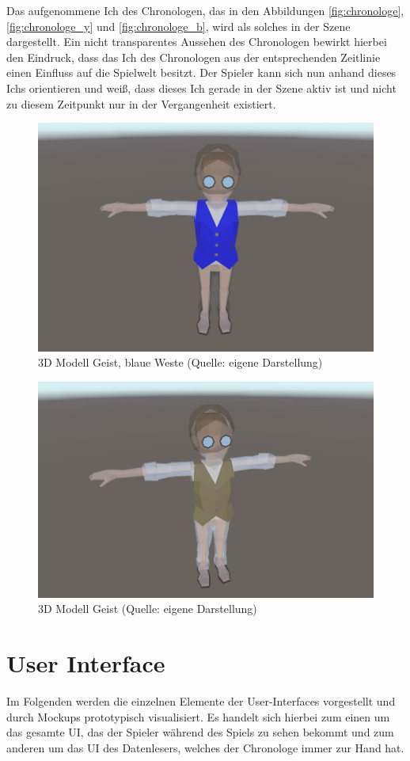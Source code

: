 Das aufgenommene Ich des Chronologen, das in den Abbildungen \ref{fig:chronologe},\ref{fig:chronologe_y} und \ref{fig:chronologe_b}, wird als solches in der Szene dargestellt. Ein nicht transparentes Aussehen des Chronologen bewirkt hierbei den Eindruck, dass das Ich des Chronologen aus der entsprechenden Zeitlinie einen Einfluss auf die Spielwelt besitzt. Der Spieler kann sich nun anhand dieses Ichs orientieren und weiß, dass dieses Ich gerade in der Szene aktiv ist und nicht zu diesem Zeitpunkt nur in der Vergangenheit existiert.
\begin{figure}[ht]
\centering
\includegraphics[width=0.8\linewidth]{content/pictures/Ghost_b.jpg}
\caption{3D Modell Geist, blaue Weste (Quelle: eigene Darstellung)}
\label{fig:ghost_b}
\end{figure}

\begin{figure}[ht]
\centering
\includegraphics[width=0.8\linewidth]{content/pictures/Ghost.jpg}
\caption{3D Modell Geist (Quelle: eigene Darstellung)}
\label{fig:ghost}
\end{figure}

\section{User Interface}\label{sec:user-interface}
Im Folgenden werden die einzelnen Elemente der User-Interfaces vorgestellt und durch Mockups prototypisch visualisiert. Es handelt sich hierbei zum einen um das gesamte \ac{UI}, das der Spieler während des Spiels zu sehen bekommt und zum anderen um das \ac{UI} des Datenlesers, welches der Chronologe immer zur Hand hat.

